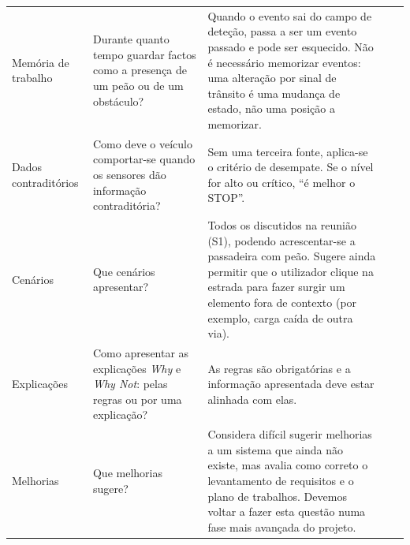 {\begin{longtable}{@{}L{2.6cm}VL{5.3cm}VL{7.0cm}@{}}
  Memória de trabalho
    & Durante quanto tempo guardar factos como a presença de um peão ou de
      um obstáculo?
    & Quando o evento sai do campo de deteção, passa a ser um evento passado
      e pode ser esquecido. Não é necessário memorizar eventos: uma alteração
      por sinal de trânsito é uma mudança de estado, não uma posição a
      memorizar. \\ \linhasep
  Dados contraditórios
    & Como deve o veículo comportar-se quando os sensores dão informação
      contraditória?
    & Sem uma terceira fonte, aplica-se o critério de desempate. Se o nível
      for alto ou crítico, \enquote{é melhor o STOP}. \\ \linhasep
  Cenários
    & Que cenários apresentar?
    & Todos os discutidos na reunião (S1), podendo acrescentar-se a
      passadeira com peão. Sugere ainda permitir que o utilizador clique na
      estrada para fazer surgir um elemento fora de contexto (por exemplo,
      carga caída de outra via). \\ \linhasep
  Explicações
    & Como apresentar as explicações \emph{Why} e \emph{Why Not}: pelas
      regras ou por uma explicação?
    & As regras são obrigatórias e a informação apresentada deve estar
      alinhada com elas. \\ \linhasep
  Melhorias
    & Que melhorias sugere?
    & Considera difícil sugerir melhorias a um sistema que ainda não existe,
      mas avalia como correto o levantamento de requisitos e o plano de
      trabalhos. Devemos voltar a fazer esta questão numa fase mais avançada
      do projeto. \\
\end{longtable}
}
